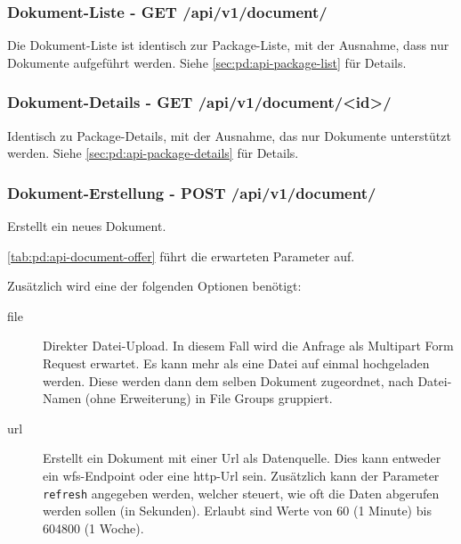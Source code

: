 \subsubsection{Dokument-Liste - GET /api/v1/document/}
Die Dokument-Liste ist identisch zur Package-Liste, mit der Ausnahme, dass nur Dokumente aufgeführt werden. Siehe \cref{sec:pd:api-package-list} für Details.

\subsubsection{Dokument-Details - GET /api/v1/document/<id>/} \label{sec:pd:api-document-details}
Identisch zu Package-Details, mit der Ausnahme, das nur Dokumente unterstützt werden. Siehe \cref{sec:pd:api-package-details} für Details.

\subsubsection{Dokument-Erstellung - POST /api/v1/document/}
Erstellt ein neues Dokument. 

\cref{tab:pd:api-document-offer} führt die erwarteten Parameter auf.

Zusätzlich wird eine der folgenden Optionen benötigt:
\begin{description}
\item[file] Direkter Datei-Upload. In diesem Fall wird die Anfrage als Multipart Form Request erwartet. Es kann mehr als eine Datei auf einmal hochgeladen werden. Diese werden dann dem selben Dokument zugeordnet, nach Datei-Namen (ohne Erweiterung) in File Groups gruppiert.
\item[url] Erstellt ein Dokument mit einer Url als Datenquelle. Dies kann entweder ein \gls{wfs}-Endpoint oder eine http-Url sein. Zusätzlich kann der Parameter \texttt{refresh} angegeben werden, welcher steuert, wie oft die Daten abgerufen werden sollen (in Sekunden). Erlaubt sind Werte von 60 (1 Minute) bis 604800 (1 Woche).
\end{description}

